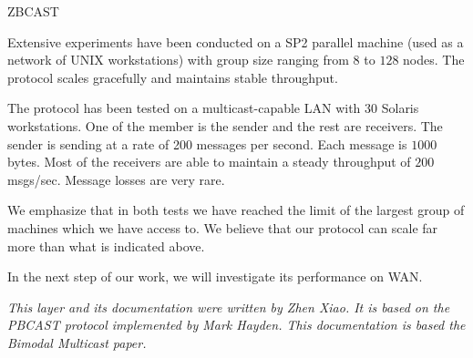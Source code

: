 \begin{Layer}{ZBCAST}
\begin{GenEvent}
\genevent{\DnCast}
\genevent{\DnSend}
\genevent{\UpLostMessage}
\end{GenEvent}

\begin{Testing}
\item
Extensive experiments have been conducted on a SP2 parallel machine
(used as a network of UNIX workstations) with group size ranging from
$8$ to $128$ nodes.  The protocol scales gracefully and maintains
stable throughput.
\item
The protocol has been tested on a multicast-capable LAN with 30
Solaris workstations.  One of the member is the sender and the rest
are receivers.  The sender is sending at a rate of 200 messages per
second.  Each message is $1000$ bytes.  Most of the receivers are able
to maintain a steady throughput of $200$ msgs/sec.  Message losses are
very rare.

We emphasize that in both tests we have reached the limit of the
largest group of machines which we have access to.  We believe that
our protocol can scale far more than what is indicated above.
\item
In the next step of our work, we will investigate its performance on WAN.
\end{Testing}

\emph{This layer and its documentation were written by Zhen Xiao.  It
is based on the \emph{PBCAST} protocol implemented by Mark Hayden.
This documentation is based the \emph{Bimodal Multicast} paper.}
\end{Layer}
